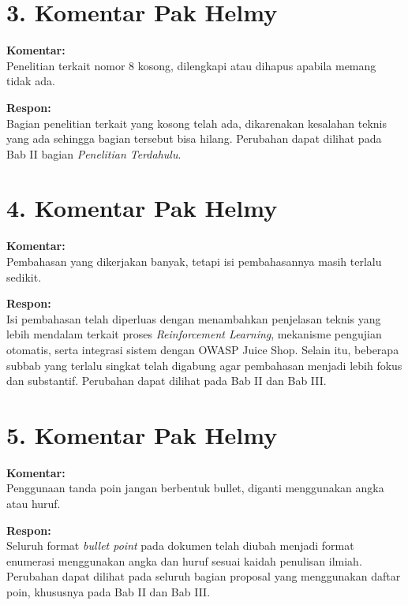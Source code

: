\vspace{0.5cm}

\section*{3. Komentar Pak Helmy}
\textbf{Komentar:} \\
Penelitian terkait nomor 8 kosong, dilengkapi atau dihapus apabila memang tidak ada.

\textbf{Respon:} \\
Bagian penelitian terkait yang kosong telah ada, dikarenakan kesalahan teknis yang ada sehingga bagian tersebut bisa hilang. Perubahan dapat dilihat pada Bab II bagian \textit{Penelitian Terdahulu}.

\vspace{0.5cm}

\section*{4. Komentar Pak Helmy}
\textbf{Komentar:} \\
Pembahasan yang dikerjakan banyak, tetapi isi pembahasannya masih terlalu sedikit.

\textbf{Respon:} \\
Isi pembahasan telah diperluas dengan menambahkan penjelasan teknis yang lebih mendalam terkait proses \textit{Reinforcement Learning}, mekanisme pengujian otomatis, serta integrasi sistem dengan OWASP Juice Shop. Selain itu, beberapa subbab yang terlalu singkat telah digabung agar pembahasan menjadi lebih fokus dan substantif. Perubahan dapat dilihat pada Bab II dan Bab III.

\vspace{0.5cm}

\section*{5. Komentar Pak Helmy}
\textbf{Komentar:} \\
Penggunaan tanda poin jangan berbentuk bullet, diganti menggunakan angka atau huruf.

\textbf{Respon:} \\
Seluruh format \textit{bullet point} pada dokumen telah diubah menjadi format enumerasi menggunakan angka dan huruf sesuai kaidah penulisan ilmiah. Perubahan dapat dilihat pada seluruh bagian proposal yang menggunakan daftar poin, khususnya pada Bab II dan Bab III.

\vspace{0.5cm}

